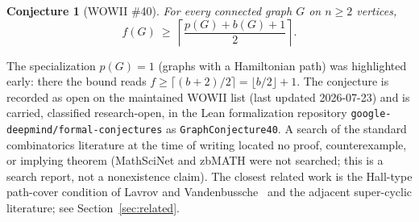 \documentclass[11pt]{article}
\theoremstyle{plain}
\newtheorem{conjecture}[theorem]{Conjecture}
\theoremstyle{definition}
\begin{document}
\begin{conjecture}[WOWII \#40]\label{conj:main}
For every connected graph $G$ on $n\ge2$ vertices,
\[
f(G)\ \ge\ \left\lceil \frac{p(G)+b(G)+1}{2}\right\rceil .
\]
\end{conjecture}

The specialization $p(G)=1$ (graphs with a Hamiltonian path) was highlighted
early: there the bound reads $f\ge\lceil(b+2)/2\rceil=\lfloor b/2\rfloor+1$.
The conjecture is recorded as open on the maintained WOWII list (last updated
2026-07-23) and is carried, classified research-open, in the Lean formalization
repository \texttt{google-deepmind/formal-conjectures} as
\texttt{GraphConjecture40}. A search of the standard combinatorics literature at
the time of writing located no proof, counterexample, or implying theorem
(MathSciNet and zbMATH were not searched; this is a search report, not a
nonexistence claim). The closest related work is the Hall-type path-cover
condition of Lavrov and Vandenbussche~\cite{LV2024} and the adjacent super-cyclic
literature; see Section~\ref{sec:related}.
\end{document}
